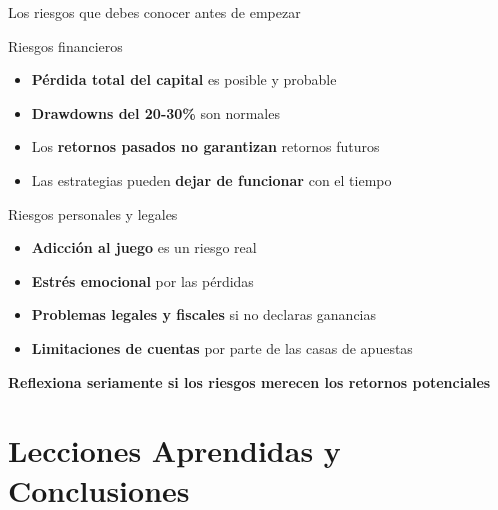 \documentclass[aspectratio=169]{beamer}
\begin{document}
\begin{frame}{Los riesgos que debes conocer antes de empezar}
\begin{alertblock}{Riesgos financieros}
\begin{itemize}
\item \textcolor{rojoperdida}{\textbf{Pérdida total del capital}} es posible y probable
\item \textbf{Drawdowns del 20-30\%} son normales
\item Los \textbf{retornos pasados no garantizan} retornos futuros
\item Las estrategias pueden \textbf{dejar de funcionar} con el tiempo
\end{itemize}
\end{alertblock}

\begin{alertblock}{Riesgos personales y legales}
\begin{itemize}
\item \textcolor{naranjaatencion}{\textbf{Adicción al juego}} es un riesgo real
\item \textbf{Estrés emocional} por las pérdidas
\item \textbf{Problemas legales y fiscales} si no declaras ganancias
\item \textbf{Limitaciones de cuentas} por parte de las casas de apuestas
\end{itemize}
\end{alertblock}

\vspace{0.5cm}
\begin{center}
\textbf{Reflexiona seriamente si los riesgos merecen los retornos potenciales}
\end{center}
\end{frame}

\section{Lecciones Aprendidas y Conclusiones}
\end{document}
